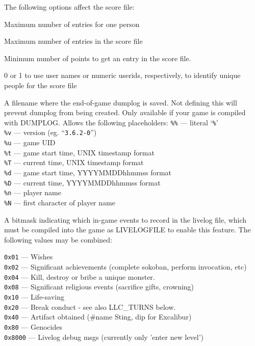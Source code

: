 The following options affect the score file:
\blist {}
\item[\ib{PERSMAX}]
Maximum number of entries for one person
\item[\ib{ENTRYMAX}]
Maximum number of entries in the score file
\item[\ib{POINTSMIN}]
Minimum number of points to get an entry in the score file.
\item[\ib{PERS\verb+_+IS\verb+_+UID}]
0 or 1 to use user names or numeric userids, respectively, to identify
unique people for the score file
\item[\ib{DUMPLOGFILE}]
A filename where the end-of-game dumplog is saved.
Not defining this will prevent dumplog from being created. Only available
if your game is compiled with DUMPLOG. Allows the following placeholders:
{\tt \%\%}  --- literal `{\tt \%}'\\
{\tt \%v}  --- version (eg. ``{\tt 3.6.2-0}'')\\
{\tt \%u}  --- game UID\\
{\tt \%t}  --- game start time, UNIX timestamp format\\
{\tt \%T}  --- current time, UNIX timestamp format\\
{\tt \%d}  --- game start time, YYYYMMDDhhmmss format\\
{\tt \%D}  --- current time, YYYYMMDDhhmmss format\\
{\tt \%n}  --- player name\\
{\tt \%N}  --- first character of player name
\item[\ib{LIVELOG}]
A bitmask indicating which in-game events to record in the livelog file,
which must be compiled into the game as LIVELOGFILE to enable this
feature.  The following values may be combined:

{\tt 0x01}  --- Wishes\\
{\tt 0x02}  --- Significant achievements (complete sokoban, perform invocation, etc)\\
{\tt 0x04}  --- Kill, destroy or bribe a unique monster.\\
{\tt 0x08}  --- Significant religious events (sacrifice gifts, crowning)\\
{\tt 0x10}  --- Life-saving\\
{\tt 0x20}  --- Break conduct - see also LLC\_TURNS below.\\
{\tt 0x40}  --- Artifact obtained (#name Sting, dip for Excalibur)\\
{\tt 0x80}  --- Genocides\\
{\tt 0x8000}  --- Livelog debug msgs (currently only 'enter new level')

